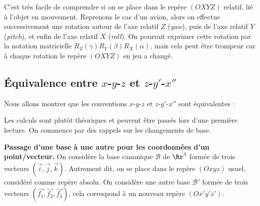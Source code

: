 \documentclass[11pt,class=report,crop=false]{standalone}
\begin{document}
\begin{center}
	\begin{minipage}{0.45\textwidth}
	\end{minipage}
		\qquad
	\begin{minipage}{0.45\textwidth}	
	\end{minipage}	
\end{center}
	
\begin{center}
	\begin{minipage}{0.45\textwidth}
	\end{minipage}
	\qquad
	\begin{minipage}{0.45\textwidth}	
	\end{minipage}	
\end{center}

C'est très facile de comprendre si on se place dans le repère  $(OXYZ)$ relatif, lié à l'objet en mouvement. Reprenons le cas d'un avion, alors on effectue successivement une rotation autour de l'axe relatif $Z$ (\emph{yaw}), puis de l'axe relatif $Y$ (\emph{pitch}), et enfin de l'axe relatif $X$ (\emph{roll}).
On pourrait exprimer cette rotation par la notation matricielle $R_Z(\gamma) R_Y(\beta) R_X(\alpha)$, mais cela peut être trompeur car à chaque rotation le repère $(OXYZ)$ en jeu a changé.


\subsection{Équivalence entre $x$-$y$-$z$ et $z$-$y'$-$x''$}

Nous allons montrer que les conventions $x$-$y$-$z$ et $z$-$y'$-$x''$ sont équivalentes :



Les calculs sont plutôt théoriques et peuvent être passés lors d'une première lecture.
On commence par des rappels sur les changements de base.


\textbf{Passage d'une base à une autre pour les coordonnées d'un point/vecteur.}
On considère la base canonique $\mathcal{B}$ de $\Rr^3$ formée de trois vecteurs $(\vec i, \vec j, \vec k)$. Autrement dit, on se place dans le repère $(Oxyz)$ usuel, considéré comme repère absolu.
On considère une autre base $\mathcal{B}'$ formée de trois vecteurs $(\vec{f_1},\vec{f_2},\vec{f_3})$, cela correspond à un nouveau repère $(Ox'y'z')$.
\end{document}
